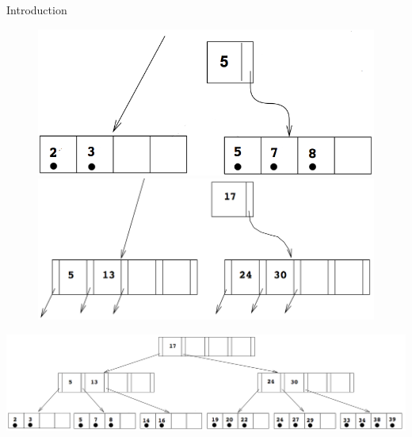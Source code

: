 \documentclass{beamer}
\begin{document}
\begin{section}{Introduction}
\begin{frame}
      \vspace{-2em}
      \begin{figure}[!ht]
        \centering
        \begin{center}
          \includegraphics[valign=t,scale=0.15]{images/B+Tree_op1.png}
          \quad
          \pause
          \includegraphics[valign=t,scale=0.15]{images/B+Tree_op2.png}
        \end{center}
      \end{figure}
      \pause

      \begin{center}
      \includegraphics[scale=0.2]{images/B+Tree_op3.png}
      \end{center}
    \end{frame}
  \end{section}
\end{document}
